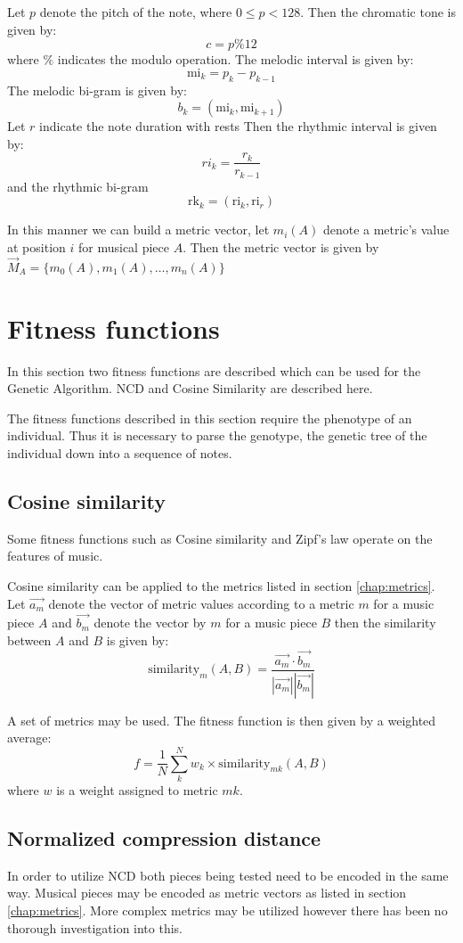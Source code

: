 Let $p$ denote the pitch of the note, where $0 \leq p < 128$.
Then the chromatic tone is given by:
\[c = p \% 12\]
where $\%$ indicates the modulo operation.
The melodic interval is given by:
\[\text{mi}_k = p_k - p_{k-1} \]
The melodic bi-gram is given by:
\[b_k = (\text{mi}_k, \text{mi}_{k+1}) \]
Let $r$ indicate the note duration with rests
Then the rhythmic interval is given by:
\[\text{}ri_k = \frac{r_k}{r_{k-1}} \]
and the rhythmic bi-gram
\[\text{rk}_k = (\text{ri}_k, \text{ri}_r) \]

In this manner we can build a metric vector, let $m_i(A)$ denote a metric's value at position $i$ for musical piece $A$. Then the metric vector is given by $\vec{M}_A = \{m_0(A), m_1(A), \ldots, m_n(A) \}$ 


\section{Fitness functions}

In this section two fitness functions are described which can be used for the Genetic Algorithm. \ac{NCD} and Cosine Similarity are described here.

The fitness functions described in this section require the phenotype of an individual. Thus it is necessary to parse the genotype, the genetic tree of the individual down into a sequence of notes.

\subsection{Cosine similarity}
Some fitness functions such as Cosine similarity and Zipf's law operate on the features of music. 

Cosine similarity can be applied to the metrics listed in section \ref{chap:metrics}. Let $\vec{a_m}$ denote the vector of metric values according to a metric $m$ for a music piece $A$ and $\vec{b_m}$ denote the vector by $m$ for a music piece $B$ then the similarity between $A$ and $B$ is given by:
\[\text{similarity}_m(A,B) = \frac{\vec{a_m} \cdot \vec{b_m}}{|\vec{a_m}| |\vec{b_m}|}\]

A set of metrics may be used. 
The fitness function is then given by a weighted average:
\[f = \frac{1}{N} \sum_{k}^N w_k \times \text{similarity}_{mk}(A,B) \]
where $w$ is a weight assigned to metric $mk$.

\subsection{Normalized compression distance}
In order to utilize \ac{NCD} both pieces being tested need to be encoded in the same way. Musical pieces may be encoded as metric vectors as listed in section \ref{chap:metrics}. More complex metrics may be utilized however there has been no thorough investigation into this.

